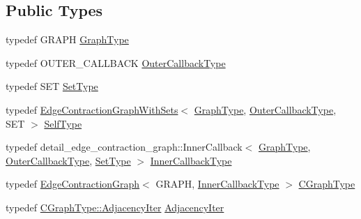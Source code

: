 \subsection*{Public Types}
\begin{DoxyCompactItemize}
\item 
typedef G\+R\+A\+PH \hyperlink{structnifty_1_1graph_1_1EdgeContractionGraphWithSetsHelper_a7f5226bf25f277d906a526db55556cdf}{Graph\+Type}
\item 
typedef O\+U\+T\+E\+R\+\_\+\+C\+A\+L\+L\+B\+A\+CK \hyperlink{structnifty_1_1graph_1_1EdgeContractionGraphWithSetsHelper_a3e0b97cbc8de91c57e3dc83860edda69}{Outer\+Callback\+Type}
\item 
typedef S\+ET \hyperlink{structnifty_1_1graph_1_1EdgeContractionGraphWithSetsHelper_acc1b924a2b02648491b614c8d69ca9fb}{Set\+Type}
\item 
typedef \hyperlink{classnifty_1_1graph_1_1EdgeContractionGraphWithSets}{Edge\+Contraction\+Graph\+With\+Sets}$<$ \hyperlink{structnifty_1_1graph_1_1EdgeContractionGraphWithSetsHelper_a7f5226bf25f277d906a526db55556cdf}{Graph\+Type}, \hyperlink{structnifty_1_1graph_1_1EdgeContractionGraphWithSetsHelper_a3e0b97cbc8de91c57e3dc83860edda69}{Outer\+Callback\+Type}, S\+ET $>$ \hyperlink{structnifty_1_1graph_1_1EdgeContractionGraphWithSetsHelper_a7b0578f3509ed396dd72b029e4e8b105}{Self\+Type}
\item 
typedef detail\+\_\+edge\+\_\+contraction\+\_\+graph\+::\+Inner\+Callback$<$ \hyperlink{structnifty_1_1graph_1_1EdgeContractionGraphWithSetsHelper_a7f5226bf25f277d906a526db55556cdf}{Graph\+Type}, \hyperlink{structnifty_1_1graph_1_1EdgeContractionGraphWithSetsHelper_a3e0b97cbc8de91c57e3dc83860edda69}{Outer\+Callback\+Type}, \hyperlink{structnifty_1_1graph_1_1EdgeContractionGraphWithSetsHelper_acc1b924a2b02648491b614c8d69ca9fb}{Set\+Type} $>$ \hyperlink{structnifty_1_1graph_1_1EdgeContractionGraphWithSetsHelper_a04b455cc805d998b02d24ee3a11523ec}{Inner\+Callback\+Type}
\item 
typedef \hyperlink{classnifty_1_1graph_1_1EdgeContractionGraph}{Edge\+Contraction\+Graph}$<$ G\+R\+A\+PH, \hyperlink{structnifty_1_1graph_1_1EdgeContractionGraphWithSetsHelper_a04b455cc805d998b02d24ee3a11523ec}{Inner\+Callback\+Type} $>$ \hyperlink{structnifty_1_1graph_1_1EdgeContractionGraphWithSetsHelper_add695ccd6756ec7e79ce2b4e6fceb5fc}{C\+Graph\+Type}
\item 
typedef \hyperlink{classnifty_1_1graph_1_1EdgeContractionGraph_a447212f5ced0c4ef4d304e8b89f4f200}{C\+Graph\+Type\+::\+Adjacency\+Iter} \hyperlink{structnifty_1_1graph_1_1EdgeContractionGraphWithSetsHelper_a9d9969291ab3cf558c7ad2f00a2c189d}{Adjacency\+Iter}

\end{DoxyCompactItemize}
